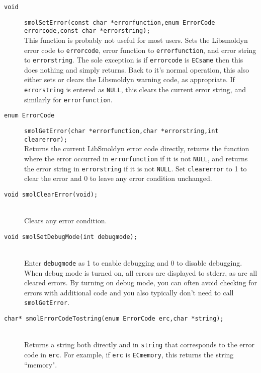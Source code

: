 \documentclass {book}
\begin{document}
\begin{description}

\item[\texttt{void}]
\texttt{smolSetError(const char *errorfunction,enum ErrorCode errorcode,const char *errorstring);}
\hfill \\
This function is probably not useful for most users.  Sets the Libsmoldyn error code to \texttt{errorcode}, error function to \texttt{errorfunction}, and error string to \texttt{errorstring}.  The sole exception is if \texttt{errorcode} is \texttt{ECsame} then this does nothing and simply returns.  Back to it's normal operation, this also either sets or clears the Libsmoldyn warning code, as appropriate.  If \texttt{errorstring} is entered as \texttt{NULL}, this clears the current error string, and similarly for \texttt{errorfunction}.

\item[\texttt{enum ErrorCode}]
\texttt{smolGetError(char *errorfunction,char *errorstring,int clearerror);}
\hfill \\
Returns the current LibSmoldyn error code directly, returns the function where the error occurred in \texttt{errorfunction} if it is not \texttt{NULL}, and returns the error string in \texttt{errorstring} if it is not \texttt{NULL}.  Set \texttt{clearerror} to 1 to clear the error and 0 to leave any error condition unchanged.

\item[\texttt{void	 smolClearError(void);}]
\hfill \\
Clears any error condition.

\item[\texttt{void smolSetDebugMode(int debugmode);}]
\hfill \\
Enter \texttt{debugmode} as 1 to enable debugging and 0 to disable debugging.  When debug mode is turned on, all errors are displayed to stderr, as are all cleared errors.  By turning on debug mode, you can often avoid checking for errors with additional code and you also typically don't need to call \texttt{smolGetError}.

\item[\texttt{char* smolErrorCodeTostring(enum ErrorCode erc,char *string);}]
\hfill \\
Returns a string both directly and in \texttt{string} that corresponds to the error code in \texttt{erc}.  For example, if \texttt{erc} is \texttt{ECmemory}, this returns the string ``memory".

\end{description}
\end{document}
